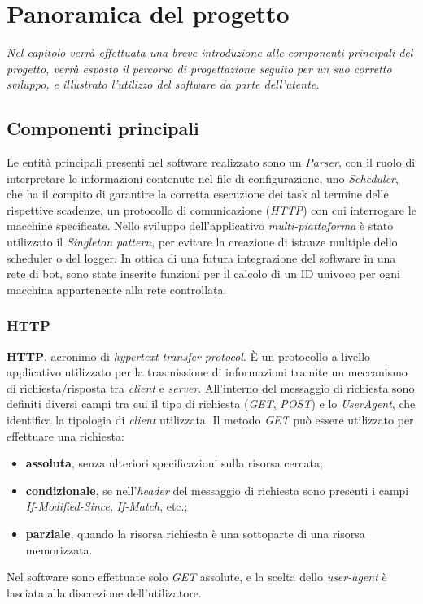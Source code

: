 \chapter{Panoramica del progetto}
\begin{minipage}{12cm}\textit{Nel capitolo verr\`{a} effettuata una breve introduzione alle componenti principali del progetto, verr\`{a} esposto il percorso di progettazione seguito per un suo corretto sviluppo, e illustrato l'utilizzo del software da parte dell'utente.}
\end{minipage}

\vspace*{1cm}
\section{Componenti principali}
Le entit\`{a} principali presenti nel software realizzato sono un \textit{Parser}, con il ruolo di interpretare le informazioni contenute nel file di configurazione, uno \textit{Scheduler}, che ha il compito di garantire la corretta esecuzione dei task al termine delle rispettive scadenze, un protocollo di comunicazione (\textit{HTTP}) con cui interrogare le macchine specificate. Nello sviluppo dell'applicativo \textit{multi-piattaforma} \`{e} stato utilizzato il \textit{Singleton pattern}, per evitare la creazione di istanze multiple dello scheduler o del logger.
In ottica di una futura integrazione del software in una rete di bot, sono state inserite funzioni per il calcolo di un ID univoco per ogni macchina appartenente alla rete controllata.

\vspace*{0.5cm}
\subsection{HTTP}
\textbf{HTTP}, acronimo di \textit{hypertext transfer protocol}.
\`E un protocollo a livello applicativo utilizzato per la
trasmissione di informazioni tramite un meccanismo di richiesta/risposta tra \textit{client} e \textit{server}. All'interno del messaggio di richiesta sono definiti diversi campi tra cui il tipo di
richiesta (\textit{GET}, \textit{POST}) e lo \textit{UserAgent}, che identifica la tipologia di \textit{client} utilizzata.
Il metodo \textit{GET} pu\`{o} essere utilizzato per effettuare una richiesta:
\begin{itemize}
\item \textbf{assoluta}, senza ulteriori specificazioni sulla risorsa cercata;
\item \textbf{condizionale}, se nell'\textit{header} del messaggio di richiesta sono presenti i campi \textit{If-Modified-Since}, \textit{If-Match}, etc.;
\item \textbf{parziale}, quando la risorsa richiesta \`e una sottoparte di una risorsa memorizzata.
\end{itemize}
Nel software sono effettuate solo \textit{GET} assolute, e la scelta dello \textit{user-agent} \`{e} lasciata alla discrezione dell'utilizatore.

